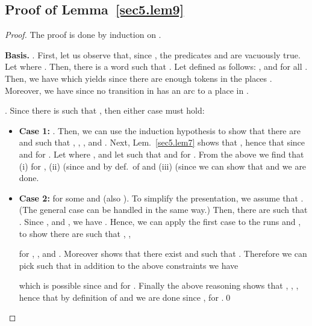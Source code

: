 \documentclass{fsttcs}
\begin{document}
\subsection{Proof of Lemma~\ref{sec5.lem9}}

\begin{proof} The proof is done by induction on .

\medskip

\noindent
{\bf Basis.} . First, let us observe that, since , the predicates
 and 
are vacuously true. Let  where . Then, there is a word  such
that . Let  defined as follows:
, and  for all .
Then, we have  which yields  since there are enough
tokens in the places . Moreover, we have  since no
transition in  has an arc to a place in .

\medskip

 .  Since there is  such that , then either case must hold: 

\begin{itemize}
\item {\bf Case 1:} . Then, we can use the induction
  hypothesis to show that there are  and
    such that , ,
  , and
  . 
  Next, Lem.~\ref{sec5.lem7} shows that
  ,
  hence that  since
   and  for
  . 
  Let   where ,
  and let  such that  and  for .
  From the above we find that (i)   for
  , (ii)  (since  and by def.\ of  and
  (iii)  (since 
  we can show that  and we are done.
\item {\bf Case 2:}  for
  some   and  
  (also ).
  To simplify the presentation, we assume  that . (The general case
  can be handled in the same way.)  Then, there are  such that . Since ,  and
  , we have
  . Hence, we can apply the
  first case to the runs   and  , to show there are  such that , 
  , 
  
  for , 
  , and . 
Moreover  shows that
  there exist  and 
   such that .
  Therefore we can pick  such that
  in addition to the above constraints we have
  
  which is possible since  and
   for . Finally the above reasoning
  shows that 
  ,
  ,
  , hence that
   by definition of  and we are done
  since ,  for .\qed
\end{itemize}
\end{proof}
\end{document}
